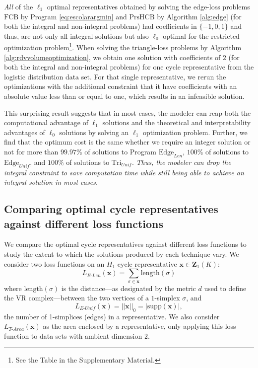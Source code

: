 \documentclass[utf8]{formatting_stuff/frontiersFPHY}
\newcommand{\Cycles}[0]{\mathbf{Z}}
\newcommand{\optimalrep}{\mathbf{x}}
\newcommand{\supp}{\mathrm{supp}}
\newcommand{\unif}{_{Unif}}
\newcommand{\len}{_{Len}}
\newcommand{\setoffilteredcyclebases}{\mathrm{FCB}}
\newcommand{\setofpersistenthcyclebases}{\mathrm{PrsHCB}}
\newcommand{\pr}{Program }
\newcommand{\Edge}{\mathrm{Edge}}
\newcommand{\Tri}{\mathrm{Tri}}
\newcommand{\EU}{_{E\text{-}Unif}}
\newcommand{\EL}{_{E\text{-}Len}}
\newcommand{\TA}{_{T\text{-}Area}}
\theoremstyle{plain}
\theoremstyle{definition}
\begin{document}
 
 \emph{All} of the $\ell_1$ optimal representatives obtained by solving the edge-loss problems $\setoffilteredcyclebases$ by \pr \eqref{eq:escolarargmin} and $\setofpersistenthcyclebases$ by Algorithm \ref{alg:edge} (for both the integral and non-integral problems) had coefficients in $\{-1, 0, 1\}$ and thus, are not only all integral solutions but also $\ell_0$ optimal for the restricted optimization problem\footnote{See the Table in the Supplementary Material.}. When solving the triangle-loss problems by Algorithm \ref{alg:rdvvolumeoptimization}, we obtain one solution with coefficients of $2$ (for both the integral and non-integral problems) for one cycle representative from the logistic distribution data set. For that single representative, we rerun the optimizations with the additional constraint that it have coefficients with an absolute value less than or equal to one, which results in an infeasible solution. 
 
 

This surprising result suggests that in most cases, the modeler can reap both the computational advantage of $\ell_1$ solutions and the theoretical and interpretability advantages of $\ell_0$ solutions by solving an $\ell_1$ optimization problem. Further, we find that the optimum cost is the same whether we require an integer solution or not for more than $99.97\%$ of solutions to \pr $\Edge\len$, $100\%$ of solutions to $\Edge\unif$, and $100\%$ of solutions to $\Tri\unif$. \emph{Thus, the modeler can drop the integral constraint to save computation time while still being able to achieve an integral solution in most cases.}  

  

\subsection{Comparing optimal cycle representatives against different loss functions}\label{sec:comparing optimal generators against different loss functions}

We compare the optimal cycle representatives against different loss functions to study the extent to which the solutions produced by each technique vary. We consider two loss functions on an $H_1$ cycle representative $\optimalrep \in \Cycles_1(K)$:
$$L\EL(\optimalrep) = \sum_{\sigma \in \optimalrep} \mathrm{length}(\sigma)$$
where $\mathrm{length}(\sigma)$ is the distance---as designated by the metric $d$ used to define the VR complex---between the two vertices of a $1$-simplex $\sigma$, and
$$L\EU(\optimalrep) = ||\optimalrep||_0=|\supp(\optimalrep)|, $$ 
the number of 1-simplices (edges) in a representative. We also consider $L\TA(\optimalrep)$ as the area enclosed by a representative, only applying this loss function to data sets with ambient dimension $2$. 
\end{document}
